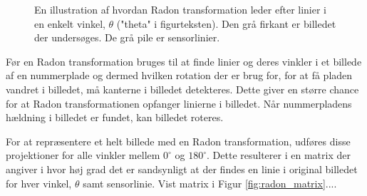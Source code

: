 \begin{figure}[htp]
  \centering
  \caption{En illustration af hvordan Radon transformation leder efter linier i en enkelt vinkel, $\theta$ ("theta" i figurteksten). Den grå firkant er billedet der undersøges. De grå pile er sensorlinier.\cite{matlab_radon}}
  \label{fig:radon_transform}
\end{figure}

Før en Radon transformation bruges til at finde linier og deres vinkler i et billede af en nummerplade og dermed hvilken rotation der er brug for, for at få pladen vandret i billedet, må kanterne i billedet detekteres. Dette giver en større chance for at Radon transformationen opfanger linierne i billedet. Når nummerpladens hældning i billedet er fundet, kan billedet roteres.

For at repræsentere et helt billede med en Radon transformation, udføres disse projektioner for alle vinkler mellem $0^{\circ}$ og $180^{\circ}$. Dette resulterer i en matrix der angiver i hvor høj grad det er sandsynligt at der findes en linie i original billedet for hver vinkel, $\theta$ samt sensorlinie. Vist matrix i Figur \vref{fig:radon_matrix}....

\begin{figure}[htp]
  \centering
  \caption{}
  \label{fig:radon_matrix}
\end{figure}

